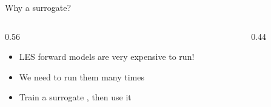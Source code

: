 \documentclass[aspectratio=169,11pt]{beamer}
\begin{document}

\begin{frame}{Why a surrogate?}
  \begin{columns}[T]
    \begin{column}{0.56\textwidth}
      \begin{itemize}\setlength\itemsep{6pt}
        \item LES forward models are very expensive to run!
        \item We need to run them many times
        \item Train a surrogate , then use it 
      \end{itemize}
    \end{column}
    \begin{column}{0.44\textwidth}
    \end{column}
  \end{columns}
\end{frame}
\end{document}
